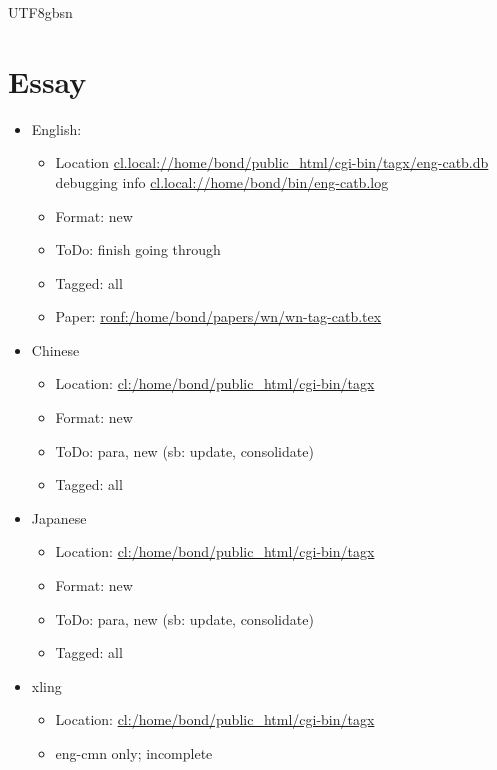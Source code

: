 \documentclass[12pt]{book} %
\begin{document}
\begin{CJK}{UTF8}{gbsn}
\section{Essay}
\begin{itemize}
\item English:
  \begin{itemize}
  \item Location \url{cl.local://home/bond/public_html/cgi-bin/tagx/eng-catb.db}
\\ debugging info \url{cl.local://home/bond/bin/eng-catb.log}
  \item Format: new
  \item ToDo:  finish going through
  \item Tagged: all
  \item Paper: \url{ronf:/home/bond/papers/wn/wn-tag-catb.tex}
  \end{itemize}
\item Chinese
  \begin{itemize}
  \item Location: \url{cl:/home/bond/public_html/cgi-bin/tagx}
  \item Format: new
  \item ToDo:  para, new (sb: update, consolidate)
  \item Tagged: all
  \end{itemize}
\item Japanese
  \begin{itemize}
  \item Location: \url{cl:/home/bond/public_html/cgi-bin/tagx}
  \item Format: new
  \item ToDo:  para, new (sb: update, consolidate)
  \item Tagged: all
  \end{itemize}
\item xling
  \begin{itemize}
  \item Location: \url{cl:/home/bond/public_html/cgi-bin/tagx}
  \item eng-cmn only; incomplete
  \end{itemize}
\end{itemize}


\end{CJK}
\end{document}
